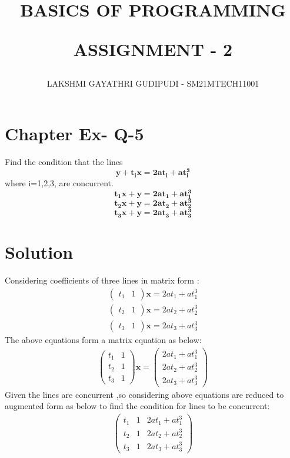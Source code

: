 \documentclass[journal,12pt,twocolumn]{IEEEtran}
\begin{document}
\newcommand{\myvec}[1]{\ensuremath{\begin{pmatrix}#1\end{pmatrix}}}
\newcommand{\cmyvec}[1]{\ensuremath{\begin{pmatrix*}[c]#1\end{pmatrix*}}}
\providecommand{\norm}[1]{\lVert#1\rVert}
\newcommand{\mydet}[1]{\ensuremath{\begin{vmatrix}#1\end{vmatrix}}}
\newcommand{\proj}[2]{\textbf{proj}_{\vec{#1}}\vec{#2}}
\newcommand{\abs}[1]{\left\lvert#1\right\rvert}
\newcommand{\RNum}[1]{\uppercase\expandafter{\romannumeral #1\relax}}
\newcommand{\Rnum}[1]{\lowercase\expandafter{\romannumeral #1\relax}}
\let\StandardTheFigure\thefigure
\let\vec\mathbf

\title{
BASICS OF PROGRAMMING

ASSIGNMENT - 2
}
\author{ LAKSHMI GAYATHRI GUDIPUDI - SM21MTECH11001}
\maketitle
\newpage
\bigskip
\renewcommand{\thefigure}{\theenumi}

\section*{ Chapter \RNum{3} Ex-\RNum{4} Q-5}
\noindent
Find the condition that the lines
$$\mathbf{y+t_i x=2at_i+at_i^3}$$
where i=1,2,3, are concurrent. 
$$\mathbf{t_1 x + y = 2at_1 +at_1^3}$$
$$\mathbf{t_2 x + y = 2at_2 +at_2^3}$$
$$\mathbf{t_3 x + y = 2at_3 +at_3^3}$$
\noindent
\section*{\textbf{Solution}}
\noindent
Considering coefficients of three lines in matrix form :
\begin{align}
\myvec{t_1&1}\vec{x}=2at_1+at_1^3\\
\myvec{t_2&1}\vec{x}=2at_2+at_2^3\\
\myvec{t_3&1}\vec{x}=2at_3+at_3^3
\end{align}
The above equations form a matrix equation as below:
\begin{align}
\myvec{t_1&1\\t_2&1\\t_3&1}\vec{x}=\myvec{2at_1+at_1^3\\2at_2+at_2^3\\2at_3+at_3^3}
\end{align}
Given the lines are concurrent ,so considering above equations are  reduced to augmented form as below to find the condition for lines to be concurrent:
\begin{align}
\myvec{
t_1&1&2at_1+at_1^3\\
t_2&1&2at_2+at_2^3\\
t_3&1&2at_3+at_3^3
}
\end{align}
\end{document}
